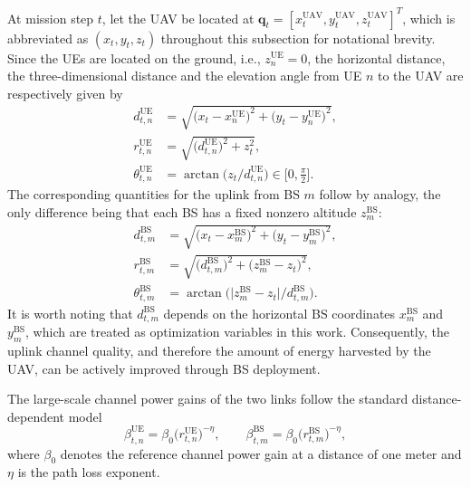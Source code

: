 \documentclass[conference]{IEEEtran}
\begin{document}
At mission step $t$, let the UAV be located at
$\mathbf{q}_t=[x_t^{\mathrm{UAV}},y_t^{\mathrm{UAV}},z_t^{\mathrm{UAV}}]^T$,
which is abbreviated as $(x_t,y_t,z_t)$ throughout this subsection for
notational brevity. Since the UEs are located on the ground, i.e.,
$z_n^{\mathrm{UE}}=0$, the horizontal distance, the three-dimensional
distance and the elevation angle from UE $n$ to the UAV are respectively
given by
\begin{equation}
\begin{aligned}
d_{t,n}^{\mathrm{UE}}&=\sqrt{\big(x_t-x_n^{\mathrm{UE}}\big)^{2}
      +\big(y_t-y_n^{\mathrm{UE}}\big)^{2}},\\
r_{t,n}^{\mathrm{UE}}&=\sqrt{\big(d_{t,n}^{\mathrm{UE}}\big)^{2}+z_t^{2}},\\
\theta_{t,n}^{\mathrm{UE}}&=\arctan\!\big(z_t\big/d_{t,n}^{\mathrm{UE}}\big)
      \in\big[0,\tfrac{\pi}{2}\big].
\end{aligned}
\end{equation}
The corresponding quantities for the uplink from BS $m$ follow by
analogy, the only difference being that each BS has a fixed nonzero
altitude $z_m^{\mathrm{BS}}$:
\begin{equation}
\begin{aligned}
d_{t,m}^{\mathrm{BS}}&=\sqrt{\big(x_t-x_m^{\mathrm{BS}}\big)^{2}
      +\big(y_t-y_m^{\mathrm{BS}}\big)^{2}},\\
r_{t,m}^{\mathrm{BS}}&=\sqrt{\big(d_{t,m}^{\mathrm{BS}}\big)^{2}
      +\big(z_m^{\mathrm{BS}}-z_t\big)^{2}},\\
\theta_{t,m}^{\mathrm{BS}}&=\arctan\!\big(\big|z_m^{\mathrm{BS}}-z_t\big|
      \big/d_{t,m}^{\mathrm{BS}}\big).
\end{aligned}
\end{equation}
It is worth noting that $d_{t,m}^{\mathrm{BS}}$ depends on the horizontal
BS coordinates $x_m^{\mathrm{BS}}$ and $y_m^{\mathrm{BS}}$, which are
treated as optimization variables in this work. Consequently, the uplink
channel quality, and therefore the amount of energy harvested by the UAV,
can be actively improved through BS deployment.

The large-scale channel power gains of the two links follow the standard
distance-dependent model
\begin{equation}
\beta_{t,n}^{\mathrm{UE}}
=\beta_{0}\big(r_{t,n}^{\mathrm{UE}}\big)^{-\eta},
\qquad
\beta_{t,m}^{\mathrm{BS}}
=\beta_{0}\big(r_{t,m}^{\mathrm{BS}}\big)^{-\eta},
\end{equation}
where $\beta_{0}$ denotes the reference channel power gain at a distance
of one meter and $\eta$ is the path loss exponent.
\end{document}
